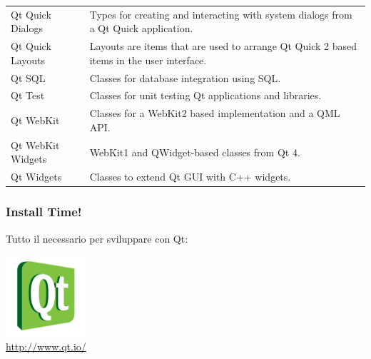 \documentclass{beamer}
\begin{document}
\begin{frame}
\begin{table}[]
\begin{tabular}{lp{8cm}}
			Qt Quick Dialogs              & Types for creating and interacting with system dialogs from a Qt Quick application.            \\
			Qt Quick Layouts              & Layouts are items that are used to arrange Qt Quick 2 based items in the user interface.       \\
			Qt SQL                        & Classes for database integration using SQL.                                                    \\
			Qt Test                       & Classes for unit testing Qt applications and libraries.                                        \\
			Qt WebKit        & Classes for a WebKit2 based implementation and a QML API. \\
			Qt WebKit Widgets & WebKit1 and QWidget-based classes from Qt 4.                                                   \\
			Qt Widgets                    & Classes to extend Qt GUI with C++ widgets.     \\
			\bottomrule
		\end{tabular}
	\end{table}
\end{frame}

\begin{frame}
	\frametitle{Install Time!}
	Tutto il necessario per sviluppare con Qt:\\
	\begin{center}
		\includegraphics[height=3cm]{images/qt.png}\\
		\url{http://www.qt.io/}
	\end{center}
\end{frame}
\end{document}
